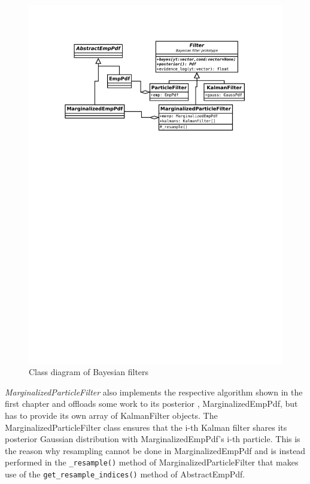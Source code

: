\begin{figure}[h!]
	\centering
	\includegraphics[width=\textwidth,keepaspectratio=true,clip=true,trim=3cm 192mm 3cm 3cm]{./diagrams/filters.pdf}
	\vspace{-8mm}
	\caption{Class diagram of Bayesian filters}
	\label{fig:DiaFilters}
\end{figure}

\emph{MarginalizedParticleFilter} also implements the respective algorithm shown in the first
chapter and offloads some work to its posterior {\pdf}, MarginalizedEmpPdf, but has to provide its
own array of KalmanFilter objects. The MarginalizedParticleFilter class ensures that the i-th Kalman
filter shares its posterior Gaussian distribution with MarginalizedEmpPdf's i-th particle. This is
the reason why resampling cannot be done in MarginalizedEmpPdf and is instead performed in the
\verb|_resample()| method of MarginalizedParticleFilter that makes use of the
\verb|get_resample_indices()| method of AbstractEmpPdf.

